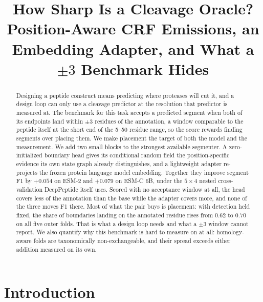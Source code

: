 \documentclass{article}
\begin{document}
\title{How Sharp Is a Cleavage Oracle? Position-Aware CRF Emissions,
an Embedding Adapter, and What a $\pm3$ Benchmark Hides}

\maketitle

\begin{abstract}
Designing a peptide construct means predicting where proteases will cut it, and a design loop can
only use a cleavage predictor at the resolution that predictor is measured at. The benchmark for
this task accepts a predicted segment when both of its endpoints land within $\pm3$ residues of the
annotation, a window comparable to the peptide itself at the short end of the 5--50 residue range,
so the score rewards finding segments over placing them. We make placement the target of both the
model and the measurement. We add two small blocks to the strongest available segmenter. A
zero-initialized boundary head gives its conditional random field the position-specific evidence
its own state graph already distinguishes, and a lightweight adapter re-projects the frozen protein
language model embedding. Together they improve segment F1 by $+0.054$ on ESM-2 and $+0.079$ on
ESM-C 6B, under the $5\times4$ nested cross-validation DeepPeptide itself uses. Scored with no acceptance window at all, the head covers less of the
annotation than the base while the adapter covers more, and none of the three moves F1 there. Most of
what the pair buys is placement: with detection held fixed, the share of boundaries landing on the
annotated residue rises from $0.62$ to $0.70$ on all five outer folds. That is what a design loop
needs and what a $\pm3$ window cannot report. We also quantify why this benchmark is
hard to measure on at all: homology-aware folds are taxonomically non-exchangeable, and their
spread exceeds either addition measured on its own.
\end{abstract}

\section{Introduction}
\label{sec:intro}

\end{document}
